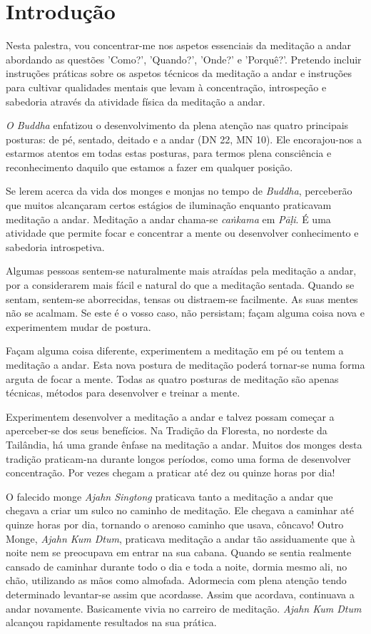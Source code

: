 \chapter{Introdução}

Nesta palestra, vou concentrar-me nos aspetos essenciais da meditação a
andar abordando as questões 'Como?', 'Quando?', 'Onde?' e 'Porquê?'.
Pretendo incluir instruções práticas sobre os aspetos técnicos da
meditação a andar e instruções para cultivar qualidades mentais que
levam à concentração, introspeção e sabedoria através da atividade
física da meditação a andar.

\emph{O Buddha} enfatizou o desenvolvimento da plena atenção nas quatro
principais posturas: de pé, sentado, deitado e a andar (DN 22, MN 10). Ele
encorajou-nos a estarmos atentos em todas estas posturas, para termos
plena consciência e reconhecimento daquilo que estamos a fazer em
qualquer posição.

Se lerem acerca da vida dos monges e monjas no tempo de \emph{Buddha},
perceberão que muitos alcançaram certos estágios de iluminação enquanto
praticavam meditação a andar. Meditação a andar chama-se \emph{caṅkama}
em \emph{Pāḷi}. É uma atividade que permite focar e concentrar a mente
ou desenvolver conhecimento e sabedoria introspetiva.

Algumas pessoas sentem-se naturalmente mais atraídas pela meditação a
andar, por a considerarem mais fácil e natural do que a meditação
sentada. Quando se sentam, sentem-se aborrecidas, tensas ou distraem-se
facilmente. As suas mentes não se acalmam. Se este é o vosso caso, não
persistam; façam alguma coisa nova e experimentem mudar de postura.

Façam alguma coisa diferente, experimentem a meditação em pé ou tentem a
meditação a andar. Esta nova postura de meditação poderá tornar-se numa
forma arguta de focar a mente. Todas as quatro posturas de meditação são
apenas técnicas, métodos para desenvolver e treinar a mente.

Experimentem desenvolver a meditação a andar e talvez possam começar a
aperceber-se dos seus benefícios. Na Tradição da Floresta, no nordeste
da Tailândia, há uma grande ênfase na meditação a andar. Muitos dos
monges desta tradição praticam-na durante longos períodos, como uma
forma de desenvolver concentração. Por vezes chegam a praticar até dez
ou quinze horas por dia!

O falecido monge \emph{Ajahn Singtong} praticava tanto a meditação a
andar que chegava a criar um sulco no caminho de meditação. Ele chegava
a caminhar até quinze horas por dia, tornando o arenoso caminho que
usava, côncavo! Outro Monge, \emph{Ajahn Kum Dtum}, praticava meditação
a andar tão assiduamente que à noite nem se preocupava em entrar na sua
cabana. Quando se sentia realmente cansado de caminhar durante todo o
dia e toda a noite, dormia mesmo ali, no chão, utilizando as mãos como
almofada. Adormecia com plena atenção tendo determinado levantar-se
assim que acordasse. Assim que acordava, continuava a andar novamente.
Basicamente vivia no carreiro de meditação. \emph{Ajahn Kum Dtum}
alcançou rapidamente resultados na sua prática.

